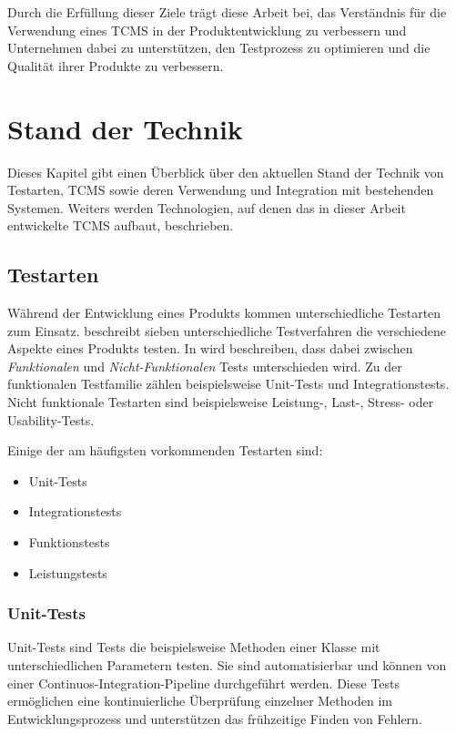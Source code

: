 \documentclass[a4paper, fontsize=11pt, parskip=half, twoside]{scrreprt}
\begin{document}
	Durch die Erfüllung dieser Ziele trägt diese Arbeit bei, das Verständnis für die Verwendung eines \ac{TCMS} in der Produktentwicklung zu verbessern und Unternehmen dabei zu unterstützen, den Testprozess zu optimieren und die Qualität ihrer Produkte zu verbessern.
	
	
	
	\chapter{Stand der Technik}
	Dieses Kapitel gibt einen Überblick über den aktuellen Stand der Technik von Testarten, \ac{TCMS} sowie deren Verwendung und Integration mit bestehenden Systemen. 
	Weiters werden Technologien, auf denen das in dieser Arbeit entwickelte \ac{TCMS} aufbaut, beschrieben.
	
	\section{Testarten} \label{sec:testtypes}
	Während der Entwicklung eines Produkts kommen unterschiedliche Testarten zum Einsatz. 
	\textcite{atlassian_unterschiedlichen_nodate} beschreibt sieben unterschiedliche Testverfahren die verschiedene Aspekte eines Produkts testen.
	In \textcite{noauthor_software_nodate} wird beschreiben, dass dabei zwischen \emph{Funktionalen} und \emph{Nicht-Funktionalen} Tests unterschieden wird.
	Zu der funktionalen Testfamilie zählen beispielsweise Unit-Tests und Integrationstests.
	Nicht funktionale Testarten sind beispielsweise Leistung-, Last-, Stress- oder Usability-Tests.
	
	Einige der am häufigsten vorkommenden Testarten sind:
	
	\begin{itemize}
		\item Unit-Tests
		\item Integrationstests
		\item Funktionstests
		\item Leistungstests
	\end{itemize}
	
	\subsection{Unit-Tests}
	Unit-Tests sind Tests die beispielsweise Methoden einer Klasse mit unterschiedlichen Parametern testen. 
	Sie sind automatisierbar und können von einer Continuos-Integration-Pipeline durchgeführt werden. 
	Diese Tests ermöglichen eine kontinuierliche Überprüfung einzelner Methoden im Entwicklungsprozess und unterstützen das frühzeitige Finden von Fehlern.
	
\end{document}
